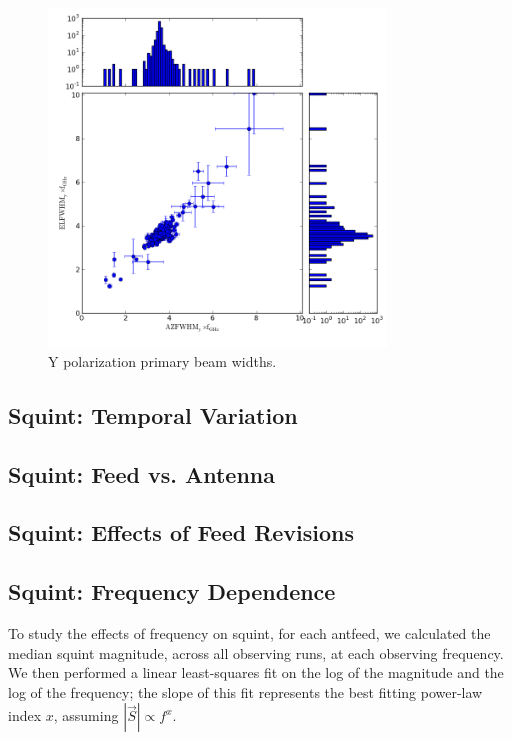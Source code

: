 \documentclass[preprint]{aastex}
\begin{document}
\begin{figure}[h!]
\begin{center}
\includegraphics[width=0.8\textwidth]{images/y_widths.png}
\caption{Y polarization primary beam widths. \label{fig.y_widths}}
\end{center}
\end{figure}

\subsection{Squint: Temporal Variation}\label{ss.temporal}

\subsection{Squint: Feed vs. Antenna}\label{ss.antfeed}

\subsection{Squint: Effects of Feed Revisions}\label{ss.revisions}

\subsection{Squint: Frequency Dependence}\label{ss.freq}
To study the effects of frequency on squint, for each antfeed, we
calculated the median squint magnitude, across all observing runs, at
each observing frequency.  We then performed a linear least-squares
fit on the log of the magnitude and the log of the frequency; the
slope of this fit represents the best fitting power-law index $x$,
assuming $|\vec{S}| \propto f^x$.
\end{document}
